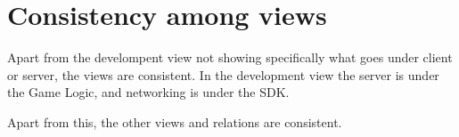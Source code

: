 \section{Consistency among views} 
\label{sec:consistencyamongviews}

Apart from the develompent view not showing specifically what goes under client
or server, the views are consistent. In the development view the server is
under the Game Logic, and networking is under the SDK\@.

Apart from this, the other views and relations are consistent.
